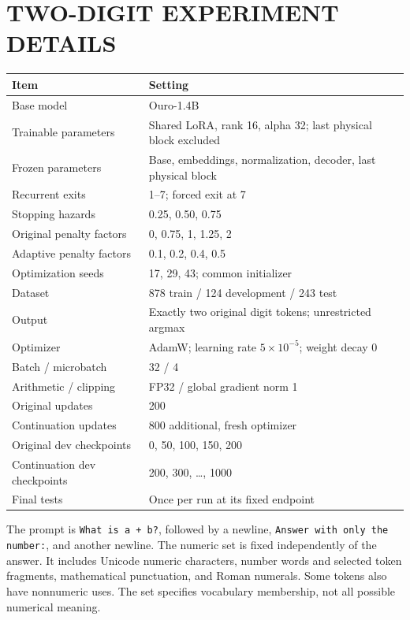 \section{TWO-DIGIT EXPERIMENT DETAILS}\label{app:repro}
\begin{table}[h]
\centering\small
\begin{tabular}{ll}
\toprule Item&Setting\\\midrule
Base model&Ouro-1.4B\\
Trainable parameters&Shared LoRA, rank 16, alpha 32; last physical block excluded\\
Frozen parameters&Base, embeddings, normalization, decoder, last physical block\\
Recurrent exits&1--7; forced exit at 7\\
Stopping hazards&0.25, 0.50, 0.75\\
Original penalty factors&0, 0.75, 1, 1.25, 2\\
Adaptive penalty factors&0.1, 0.2, 0.4, 0.5\\
Optimization seeds&17, 29, 43; common initializer\\
Dataset&878 train / 124 development / 243 test\\
Output&Exactly two original digit tokens; unrestricted argmax\\
Optimizer&AdamW; learning rate $5\times10^{-5}$; weight decay 0\\
Batch / microbatch&32 / 4\\
Arithmetic / clipping&FP32 / global gradient norm 1\\
Original updates&200\\
Continuation updates&800 additional, fresh optimizer\\
Original dev checkpoints&0, 50, 100, 150, 200\\
Continuation dev checkpoints&200, 300, \ldots, 1000\\
Final tests&Once per run at its fixed endpoint\\\bottomrule
\end{tabular}
\end{table}

The prompt is \texttt{What is a + b?}, followed by a newline, \texttt{Answer with only the number:}, and another newline. The numeric set is fixed independently of the answer. It includes Unicode numeric characters, number words and selected token fragments, mathematical punctuation, and Roman numerals. Some tokens also have nonnumeric uses. The set specifies vocabulary membership, not all possible numerical meaning.

